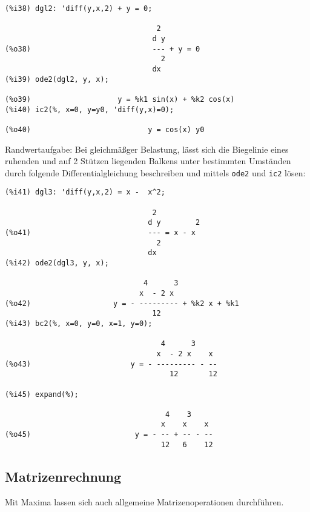 \documentclass[12pt]{scrartcl}
\begin{document}
\begin{verbatim}
(%i38) dgl2: 'diff(y,x,2) + y = 0;

                                   2
                                  d y
(%o38)                            --- + y = 0
                                    2
                                  dx
(%i39) ode2(dgl2, y, x);

(%o39)                    y = %k1 sin(x) + %k2 cos(x)
(%i40) ic2(%, x=0, y=y0, 'diff(y,x)=0);

(%o40)                           y = cos(x) y0
\end{verbatim}

Randwertaufgabe: Bei gleichmäßger Belastung, lässt sich die Biegelinie
eines ruhenden und auf 2 Stützen liegenden Balkens unter bestimmten
Umständen durch folgende Differentialgleichung beschreiben und mittels
\texttt{ode2} und \texttt{ic2} lösen:

\begin{verbatim}
(%i41) dgl3: 'diff(y,x,2) = x -  x^2;

                                  2
                                 d y        2
(%o41)                           --- = x - x
                                   2
                                 dx
(%i42) ode2(dgl3, y, x);

                                4      3
                               x  - 2 x
(%o42)                   y = - --------- + %k2 x + %k1
                                  12
(%i43) bc2(%, x=0, y=0, x=1, y=0);

                                    4      3
                                   x  - 2 x    x
(%o43)                       y = - --------- - --
                                      12       12

(%i45) expand(%);

                                     4    3
                                    x    x    x
(%o45)                        y = - -- + -- - --
                                    12   6    12
\end{verbatim}

\subsection{Matrizenrechnung}

Mit Maxima lassen sich auch allgemeine Matrizenoperationen durchführen.
\end{document}
